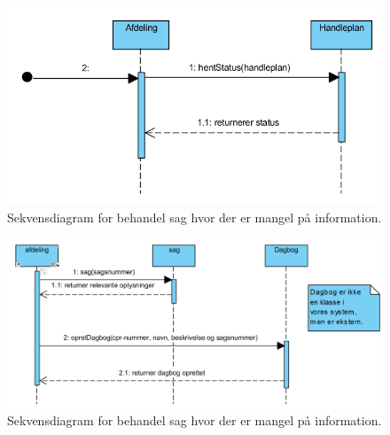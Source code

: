 \begin{figure}
  \includegraphics[width=\linewidth]{./PNG/sekDiaAfgoereSagsbehandFaerdig.PNG} 
  \caption{Sekvensdiagram for behandel sag hvor der er mangel på information.}
  \label{fig:ASFaer}
\end{figure}

\begin{figure}
  \includegraphics[width=\linewidth]{./PNG/sekDiaAfgoereSagsbehandOpret.PNG} 
  \caption{Sekvensdiagram for behandel sag hvor der er mangel på information.}
  \label{fig:ASOpret}
\end{figure}

